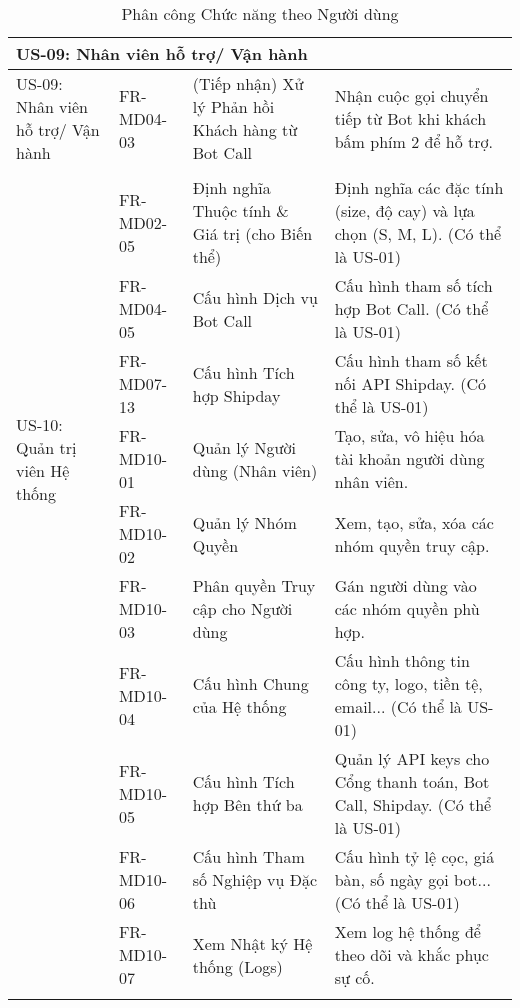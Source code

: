 \begin{longtable}{|m{2.5cm}|m{2.5cm}|m{5cm}|m{5cm}|}
\multicolumn{4}{|l|}{\textbf{US-09: Nhân viên hỗ trợ/ Vận hành}} \\ \hline
\multirow{1}{=}[2pt]{US-09: Nhân viên hỗ trợ/ Vận hành} & FR-MD04-03 & (Tiếp nhận) Xử lý Phản hồi Khách hàng từ Bot Call & Nhận cuộc gọi chuyển tiếp từ Bot khi khách bấm phím 2 để hỗ trợ. \\
&&&
\hline

\multicolumn{4}{|l|}{\textbf{US-10: Quản trị viên Hệ thống}} \\ \hline
\multirow{7}{=}[2pt]{US-10: Quản trị viên Hệ thống} & FR-MD02-05 & Định nghĩa Thuộc tính \& Giá trị (cho Biến thể) & Định nghĩa các đặc tính (size, độ cay) và lựa chọn (S, M, L). (Có thể là US-01) \\ \cline{2-4}
& FR-MD04-05 & Cấu hình Dịch vụ Bot Call & Cấu hình tham số tích hợp Bot Call. (Có thể là US-01) \\ \cline{2-4}
& FR-MD07-13 & Cấu hình Tích hợp Shipday & Cấu hình tham số kết nối API Shipday. (Có thể là US-01) \\ \cline{2-4}
& FR-MD10-01 & Quản lý Người dùng (Nhân viên) & Tạo, sửa, vô hiệu hóa tài khoản người dùng nhân viên. \\
& FR-MD10-02 & Quản lý Nhóm Quyền & Xem, tạo, sửa, xóa các nhóm quyền truy cập. \\
& FR-MD10-03 & Phân quyền Truy cập cho Người dùng & Gán người dùng vào các nhóm quyền phù hợp. \\
& FR-MD10-04 & Cấu hình Chung của Hệ thống & Cấu hình thông tin công ty, logo, tiền tệ, email... (Có thể là US-01) \\
& FR-MD10-05 & Cấu hình Tích hợp Bên thứ ba & Quản lý API keys cho Cổng thanh toán, Bot Call, Shipday. (Có thể là US-01) \\
& FR-MD10-06 & Cấu hình Tham số Nghiệp vụ Đặc thù & Cấu hình tỷ lệ cọc, giá bàn, số ngày gọi bot... (Có thể là US-01) \\
& FR-MD10-07 & Xem Nhật ký Hệ thống (Logs) & Xem log hệ thống để theo dõi và khắc phục sự cố. \\
\hline
\caption{Phân công Chức năng theo Người dùng} \label{tab:user_function_map} \\

\end{longtable}
















